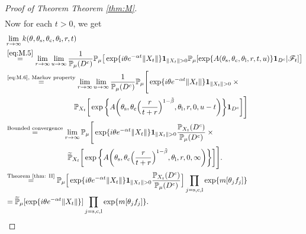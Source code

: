 \documentclass[12pt,a4paper]{amsart}
\theoremstyle{plain}
\theoremstyle{definition}
\numberwithin{equation}{section}
\begin{document}
\begin{proof}[Proof of Theorem Theorem \ref{thm:M}]
\begin{align}
\end{align}
Now for each $t>0$, we get
\begin{align}
& \lim_{r\to \infty}k(\theta,\theta_\mathrm s,\theta_\mathrm c,\theta_\mathrm l,r,t)
\\&\overset{\eqref{eq:M.5}}=\lim_{r\to \infty}\lim_{u\rightarrow \infty}\frac{1}{\mathbb P_{\mu}(D^c)}\mathbb P_{\mu}\big[\exp\{i\theta e^{-\alpha t}\|X_t\|\} \mathbf 1_{\|X_t\|>0} \mathbb P_{\mu}[\exp\{A(\theta_\mathrm s,\theta_\mathrm c,\theta_\mathrm l,r,t,u)\}\mathbf 1_{D^c}|\mathscr F_t]\big]
\\&\begin{multlined}
\overset{\text{\eqref{eq:M.6}, Markov property}}=\lim_{r\to \infty}\lim_{u\rightarrow\infty}\frac{1}{\mathbb P_{\mu}(D^c)} \mathbb P_{\mu}\Bigg[\exp\{ i\theta e^{-\alpha t}\|X_t\|\}\mathbf 1_{\|X_t\|>0} \times {}
\\ \mathbb P_{X_t}\bigg[\exp\bigg\{A\bigg(\theta_\mathrm s,\theta_\mathrm c\Big(\frac{r}{t+r}\Big)^{1-\tilde \beta},\theta_\mathrm l,r,0,u-t\bigg)\bigg\}\mathbf 1_{D^c}\bigg]\Bigg]
\end{multlined}
\\&\begin{multlined}\overset{\text{Bounded convergence}}=\lim_{r\to \infty} \mathbb P_{\mu}\Bigg[\exp\{ i\theta e^{-\alpha t}\|X_t\|\} \mathbf 1_{\|X_t\|>0}\frac{\mathbb P_{X_t}(D^c)}{\mathbb P_{\mu}(D^c)} \times {}
\\\widetilde{\mathbb P}_{X_t}\bigg[\exp\bigg\{A\bigg(\theta_\mathrm s,\theta_\mathrm c\Big(\frac{r}{t+r}\Big)^{1-\tilde \beta},\theta_\mathrm l,r,0,\infty\bigg)\bigg\}\bigg]\Bigg].
\end{multlined}
\\& \overset{\text{Theorem \ref{thm: II}}}=  \mathbb P_{\mu}\Big[\exp\{ i\theta e^{-\alpha t}\|X_t\|\} \mathbf 1_{\|X_t\|>0}\frac{\mathbb P_{X_t}(D^c)}{\mathbb P_{\mu}(D^c)} \Big]\prod_{j=\mathrm s,\mathrm c,\mathrm l}\exp\{m[\theta_j f_j]\}
\\&=\widetilde{\mathbb P}_{\mu}[\exp\{i\theta e^{-\alpha t}\|X_t\|\}]
\prod_{j=\mathrm s,\mathrm c,\mathrm l}\exp\{m[\theta_j f_j]\}.
\qedhere
\end{align}
\end{proof}
\end{document}

